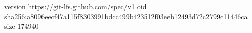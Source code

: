 version https://git-lfs.github.com/spec/v1
oid sha256:a8096eecf47a115f8303991bdcc499b423512f03eeb12493d72c2799c11446ca
size 174940

